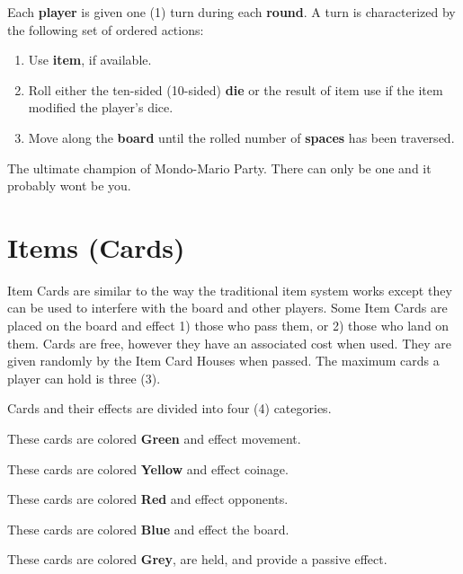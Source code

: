 \documentclass{article}
\begin{document}
\begin{description}[style=nextline]
\item[Turn] Each \textbf{player} is given one (1) turn during each \textbf{round}.
A turn is characterized by the following set of ordered actions:
\begin{enumerate}
\item Use \textbf{item}, if available.
\item Roll either the ten-sided (10-sided) \textbf{die} or the result of
item use if the item modified the player's dice.
\item Move along the \textbf{board} until the rolled number of \textbf{spaces}
has been traversed.
\end{enumerate}

\item[Winner] The ultimate champion of Mondo-Mario Party.  There can only be one
and it probably wont be you.

\end{description}

\section{Items (Cards)}

Item Cards are similar to the way the traditional item system works except
they can be used to interfere with the board and other players.
Some Item Cards are placed on the board and effect 1) those who pass them, or 2)
those who land on them.  Cards are free, however they have an associated cost when
used.  They are given randomly by the Item Card Houses when passed.  The maximum
cards a player can hold is three (3).
\vspace{2ex}

\noindent
Cards and their effects are divided into four (4) categories.

\begin{description}[style=nextline]
\item[Movement]
These cards are colored \textbf{Green} and effect movement.

\item[Money]
These cards are colored \textbf{Yellow} and effect coinage.

\item[Attack]
These cards are colored \textbf{Red} and effect opponents.

\item[Board]
These cards are colored \textbf{Blue} and effect the board.

\item[Passive]
These cards are colored \textbf{Grey}, are held, and provide
a passive effect.
\end{description}
\end{document}
